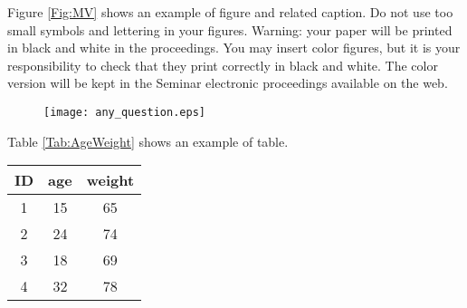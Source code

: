
Figure \ref{Fig:MV} shows an example of figure and related
caption.  Do not use too small symbols and lettering in your
figures.  Warning: your paper will be printed in black and white
in the proceedings.  You may insert color figures, but it is your
responsibility to check that they print correctly in black and
white.  The color version will be kept in the Seminar electronic
proceedings available on the web.

\begin{figure}[ht]
\centering
\texttt{[image: any\_question.eps]}
\end{figure}

Table \ref{Tab:AgeWeight} shows an example of table.

\begin{table}[h!]
  \centering
  \begin{tabular}{|c|c|c|}
    \hline
    ID & age & weight \\
    \hline
    1& 15 & 65 \\
    2& 24 & 74\\
    3& 18 & 69 \\
    4& 32 & 78 \\
    \hline
  \end{tabular}
\end{table}